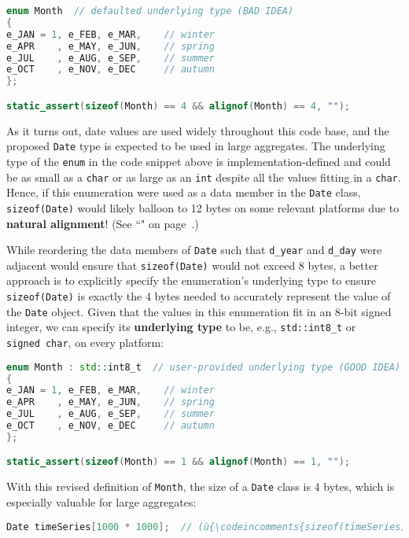 \begin{lstlisting}[language=C++]
enum Month  // defaulted underlying type (BAD IDEA)
{
e_JAN = 1, e_FEB, e_MAR,    // winter
e_APR    , e_MAY, e_JUN,    // spring
e_JUL    , e_AUG, e_SEP,    // summer
e_OCT    , e_NOV, e_DEC     // autumn
};

static_assert(sizeof(Month) == 4 && alignof(Month) == 4, "");
\end{lstlisting}

\noindent As it turns out, date values are used widely throughout this code base,
and the proposed \texttt{Date} type is expected to be used in large
aggregates. The underlying type of the \texttt{enum} in the code snippet
above is implementation-defined and could be as small as a \texttt{char}
or as large as an \texttt{int} despite all the values fitting in a
\texttt{char}. Hence, if this enumeration were used as a data member in
the \texttt{Date} class, \texttt{sizeof(Date)} would likely balloon to
12 bytes on some relevant platforms due to \textbf{natural alignment}!
(See ``" on page~\pageref{alignas}.)

While reordering the data members of \texttt{Date} such that \texttt{d\_year} and
\texttt{d\_day} were adjacent would ensure that \texttt{sizeof(Date)}
would not exceed 8 bytes, a better approach is to explicitly specify the
enumeration's underlying type to ensure \texttt{sizeof(Date)} is exactly
the 4 bytes needed to accurately represent the value of the
\texttt{Date} object. Given that the values in this enumeration fit in
an 8-bit signed integer, we can specify its \textbf{underlying type} to
be, e.g., \texttt{std::int8\_t} or \texttt{signed}~\texttt{char}, on
every platform:

\begin{lstlisting}[language=C++]
enum Month : std::int8_t  // user-provided underlying type (GOOD IDEA)
{
e_JAN = 1, e_FEB, e_MAR,    // winter
e_APR    , e_MAY, e_JUN,    // spring
e_JUL    , e_AUG, e_SEP,    // summer
e_OCT    , e_NOV, e_DEC     // autumn
};

static_assert(sizeof(Month) == 1 && alignof(Month) == 1, "");
\end{lstlisting}

\noindent With this revised definition of \texttt{Month}, the size of a
\texttt{Date} class is 4 bytes, which is especially valuable for large
aggregates:

\begin{lstlisting}[language=C++]
Date timeSeries[1000 * 1000];  // (ù{\codeincomments{sizeof(timeSeries)}}ù) is now 4Mb (not 12Mb)
\end{lstlisting}


